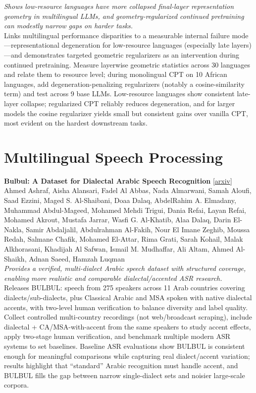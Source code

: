 \documentclass[12pt,letterpaper]{article}
\begin{document}
{\small\textit{Shows low-resource languages have more collapsed final-layer representation geometry in multilingual LLMs, and geometry-regularized continued pretraining can modestly narrow gaps on harder tasks.}}\\[1pt]
{\footnotesize Links multilingual performance disparities to a measurable internal failure mode---representational degeneration for low-resource languages (especially late layers)---and demonstrates targeted geometric regularizers as an intervention during continued pretraining. Measure layerwise geometric statistics across 30 languages and relate them to resource level; during monolingual CPT on 10 African languages, add degeneration-penalizing regularizers (notably a cosine-similarity term) and test across 9 base LLMs. Low-resource languages show consistent late-layer collapse; regularized CPT reliably reduces degeneration, and for larger models the cosine regularizer yields small but consistent gains over vanilla CPT, most evident on the hardest downstream tasks.}

\medskip


\section*{Multilingual Speech Processing}

{\small\textbf{Bulbul: A Dataset for Dialectal Arabic Speech Recognition}} {\scriptsize[\href{https://arxiv.org/abs/2608.21950}{arxiv}]}\\
{\scriptsize Ahmed Ashraf, Aisha Alansari, Fadel Al Abbas, Nada Almarwani, Samah Aloufi, Saad Ezzini, Maged S. Al-Shaibani, Doaa Dalaq, AbdelRahim A. Elmadany, Muhammad Abdul-Mageed, Mohamed Mehdi Trigui, Dania Refai, Layan Refai, Mohamed Akrout, Mustafa Jarrar, Wasfi G. Al-Khatib, Alaa Dalaq, Darin El-Nakla, Samir Abdaljalil, Abdulrahman Al-Fakih, Nour El Imane Zeghib, Moussa Redah, Salmane Chafik, Mohamed El-Attar, Rima Grati, Sarah Kohail, Malak Alkhorasani, Khadijah Al Safwan, Ismail M. Mudhaffar, Ali Altam, Ahmed Al-Shaikh, Adnan Saeed, Hamzah Luqman}\\

{\small\textit{Provides a verified, multi-dialect Arabic speech dataset with structured coverage, enabling more realistic and comparable dialectal/accented ASR research.}}\\[1pt]
{\footnotesize Releases BULBUL: speech from 275 speakers across 11 Arab countries covering dialects/sub-dialects, plus Classical Arabic and MSA spoken with native dialectal accents, with two-level human verification to balance diversity and label quality. Collect controlled multi-country recordings (not web/broadcast scraping), include dialectal + CA/MSA-with-accent from the same speakers to study accent effects, apply two-stage human verification, and benchmark multiple modern ASR systems to set baselines. Baseline ASR evaluations show BULBUL is consistent enough for meaningful comparisons while capturing real dialect/accent variation; results highlight that ``standard'' Arabic recognition must handle accent, and BULBUL fills the gap between narrow single-dialect sets and noisier large-scale corpora.}
\end{document}

